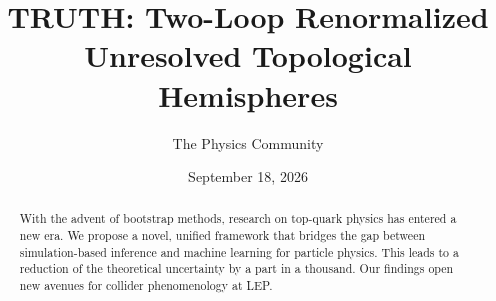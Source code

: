 \documentclass[11pt]{article}
\title{TRUTH: Two-Loop Renormalized Unresolved Topological Hemispheres}
\author{The Physics Community}
\date{September 18, 2026}
\numberwithin{equation}{section}
\theoremstyle{definition}
\theoremstyle{remark}
\begin{document}
\maketitle
\begin{abstract}
With the advent of bootstrap methods, research on top-quark physics has
entered a new era. We propose a novel, unified framework that bridges
the gap between simulation-based inference and machine learning for
particle physics. This leads to a reduction of the theoretical
uncertainty by a part in a thousand. Our findings open new avenues for
collider phenomenology at LEP.
\end{abstract}
\tableofcontents





\nocite{*}


\end{document}
